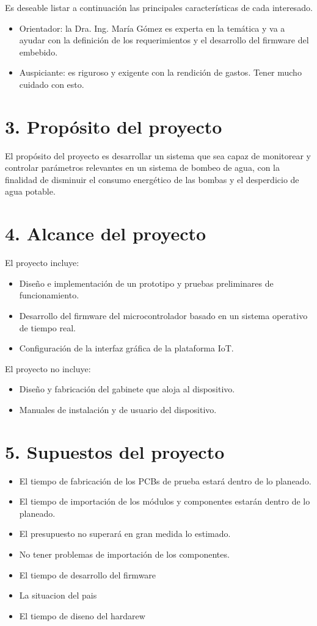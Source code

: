 \documentclass[
11pt, %
codirector, %
]{charter}
\begin{document}
Es deseable listar a continuación las principales características de cada interesado.
\begin{itemize}
	\item Orientador: la Dra. Ing. María Gómez es experta en la temática y va a ayudar con la definición de los requerimientos y el desarrollo del firmware del embebido.
	\item Auspiciante: es riguroso y exigente con la rendición de gastos. Tener mucho cuidado con esto.
\end{itemize}



\section{3. Propósito del proyecto}
\label{sec:proposito}
El propósito del proyecto es desarrollar un sistema que sea capaz de monitorear y controlar parámetros relevantes en un sistema de bombeo de agua, con la finalidad de disminuir el consumo energético de las bombas  y el desperdicio de agua potable.

\section{4. Alcance del proyecto}
\label{sec:alcance}
El proyecto incluye:
\begin{itemize}
	\item Diseño e implementación de un prototipo y pruebas preliminares de funcionamiento.
	\item Desarrollo del firmware del microcontrolador basado en un sistema operativo de tiempo real.
	\item Configuración de la interfaz gráfica de la plataforma IoT.
\end{itemize}
El proyecto no incluye:
\begin{itemize}
	\item Diseño y fabricación del gabinete que aloja al dispositivo.
	\item Manuales de instalación y de usuario del dispositivo.
\end{itemize}

\section{5. Supuestos del proyecto}
\label{sec:supuestos}

\begin{itemize}
	\item El tiempo de fabricación de los PCBs de prueba estará dentro de lo planeado.
	\item El tiempo de importación de los módulos y componentes estarán dentro de lo planeado.
	\item El presupuesto no superará en gran medida lo estimado.
	\item No tener problemas de importación de los componentes.
	\item El tiempo de desarrollo del firmware 
	\item La situacion del pais 
	\item El tiempo de diseno del hardarew

\end{itemize}
\end{document}
